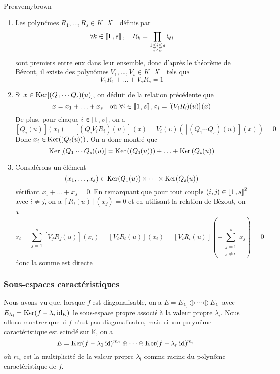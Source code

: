     \begin{demo}{Preuve}{mybrown}
        \begin{enumerate}[label=\textcolor{myjade}{(\arabic*)}]
            \item Les polynômes $R_1,\ldots,R_s \in K[X]$ définis par 
            \[ \forall k \in \left\llbracket 1 \, , s \right\rrbracket, \quad R_k = \prod_{\substack{1 \leq i \leq s \\ i \neq k}} Q_i \]    
            sont premiers entre eux dans leur ensemble, donc d’après le théorème de Bézout, il existe des polynômes $V_1, \ldots, V_s \in K[X]$ tels que 
            \[ V_1 R_1 + \ldots + V_s R_s = 1 \]    
            \item Si $x \in \operatorname{Ker}\left[(Q_1\cdots Q_s)(u)\right]$, on déduit de la relation précédente que 
            \[ x = x_1 + \ldots + x_s \quad \text{où } \forall i \in \left\llbracket 1 \, , s \right\rrbracket, x_i = \left[(V_i R_i)(u)\right](x) \]
            De plus, pour chaque $i \in \left\llbracket 1 \, , s \right\rrbracket$, on a 
            \[ \left[Q_i(u)\right](x_i) = \left[(Q_i V_i R_i)(u)\right](x) = V_i(u) \left(\left[(Q_1 \cdots Q_s)(u)\right](x)\right) = 0 \]
            Donc $x_i \in \operatorname{Ker}((Q_i(u)))$. On a donc montré que 
            \[ \operatorname{Ker}\left[(Q_1 \cdots Q_s)(u)\right] = \operatorname{Ker}\left((Q_1(u))\right) + \ldots + \operatorname{Ker}\left(Q_s(u)\right) \]     
            \item Considérons un élément 
            \[ (x_1,\ldots,x_s) \in \operatorname{Ker}(Q_1(u)) \times \cdots \times \operatorname{Ker}(Q_s(u)) \]   
            vérifiant $x_1 + \ldots + x_s = 0$. En remarquant que pour tout couple $(i,j) \in \left\llbracket 1 \, , s \right\rrbracket^2$ avec $i \neq j$, on a $\left[R_i(u)\right](x_j) = 0$ et en utilisant la relation de Bézout, on a 
            \[ x_i = \sum_{j=1}^{s} \left[V_j R_j(u)\right](x_i) = \left[V_i R_i (u)\right](x_i) = \left[V_i R_i(u)\right]\left(- \sum_{\substack{j = 1 \\ j \neq i}}^{s} x_j\right) = 0 \]
            donc la somme est directe.
        \end{enumerate}
    \end{demo}

    \subsubsection{Sous-espaces caractéristiques}

    Nous avons vu que, lorsque $f$ est diagonalisable, on a $E = E_{\lambda_1} \oplus \cdots \oplus E_{\lambda_r}$ avec $E_{\lambda_i} = \operatorname{Ker}(f - \lambda_i \operatorname{id}_E)$ le sous-espace propre associé à la valeur propre $\lambda_i$. Nous allons montrer que si $f$ n’est pas diagonalisable, mais si son polynôme caractéristique est scindé sur $\mathbb{K}$, on a 
    \[ E = \operatorname{Ker}(f - \lambda_1 \operatorname{id})^{m_1} \oplus \cdots \oplus \operatorname{Ker}(f - \lambda_r \operatorname{id})^{m_r} \]   
    où $m_i$ est la multiplicité de la valeur propre $\lambda_i$ comme racine du polynôme caractéristique de $f$.

